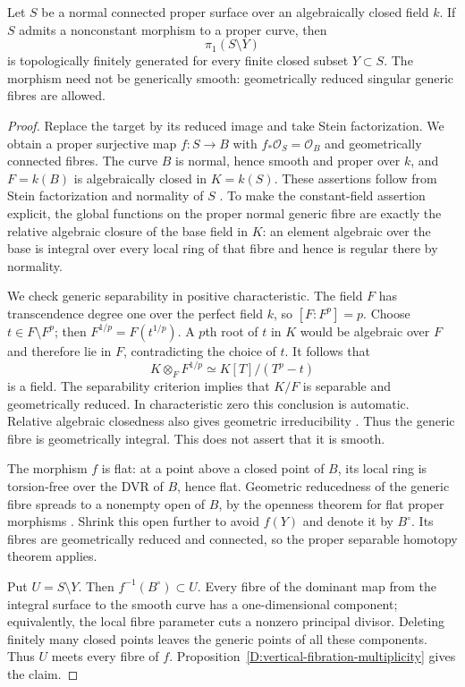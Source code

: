\begin{theorem}
\label{D:surface-map-to-curve}
Let $S$ be a normal connected proper surface over an
algebraically closed field $k$.  If $S$ admits a nonconstant
morphism to a proper curve, then
\[
                         \pi_1(S\setminus Y)
\]
is topologically finitely generated for every finite closed
subset $Y\subset S$.
The morphism need not be generically smooth: geometrically
reduced singular generic fibres are allowed.
\end{theorem}
\begin{proof}
Replace the target by its reduced image and take Stein
factorization.  We obtain a proper surjective map $f:S\to B$
with $f_*\mathcal O_S=\mathcal O_B$ and geometrically connected
fibres.  The curve $B$ is normal, hence smooth and proper over
$k$, and $F=k(B)$ is algebraically closed in $K=k(S)$.
These assertions follow from Stein factorization and normality
of $S$ \cite[Theorem 37.53.4, tag 03H0]{C_StacksFibration}.
To make the constant-field assertion explicit, the global
functions on the proper normal generic fibre are exactly the
relative algebraic closure of the base field in $K$: an element
algebraic over the base is integral over every local ring of
that fibre and hence is regular there by normality.

We check generic separability in positive characteristic.
The field $F$ has transcendence degree one over the perfect
field $k$, so $[F:F^p]=p$.  Choose $t\in F\setminus F^p$;
then $F^{1/p}=F(t^{1/p})$.  A $p$th root of $t$ in $K$ would
be algebraic over $F$ and therefore lie in $F$, contradicting
the choice of $t$.  It follows that
\[
 K\otimes_F F^{1/p}\simeq K[T]/(T^p-t)
\]
is a field.  The separability criterion
\cite[Lemma 10.44.2, tag 05DT]{C_StacksFibration} implies that
$K/F$ is separable and geometrically reduced.  In characteristic
zero this conclusion is automatic.  Relative algebraic
closedness also gives geometric irreducibility
\cite[Lemma 10.47.8, tag 037P]{C_StacksFibration}.
Thus the generic fibre is geometrically integral.  This does
not assert that it is smooth.

The morphism $f$ is flat: at a point above a closed point of
$B$, its local ring is torsion-free over the DVR of $B$, hence
flat.  Geometric reducedness of the generic fibre spreads to
a nonempty open of $B$, by the openness theorem for flat proper
morphisms
\cite[Lemma 37.26.7, tag 0C0E]{C_StacksFibration}.
Shrink this open further to avoid $f(Y)$ and denote it by
$B^\circ$.  Its fibres are geometrically reduced and connected,
so the proper separable homotopy theorem applies.

Put $U=S\setminus Y$.  Then $f^{-1}(B^\circ)\subset U$.
Every fibre of the dominant map from the integral surface to
the smooth curve has a one-dimensional component; equivalently,
the local fibre parameter cuts a nonzero principal divisor.
Deleting finitely many closed points leaves the generic points
of all these components.  Thus $U$ meets every fibre of $f$.
Proposition~\ref{D:vertical-fibration-multiplicity} gives the
claim.
\end{proof}

